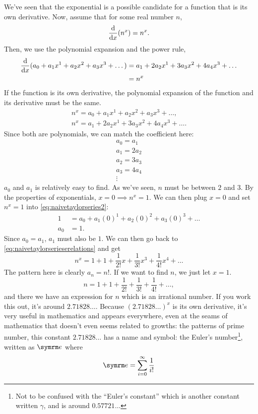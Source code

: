 We've seen that the exponential is a possible candidate for a function that is its own derivative. Now, assume that for some real number $n$,
\begin{equation}
    \odv*{(n^x)}{x} = n^x.
\end{equation}
Then, we use the polynomial expansion and the power rule,
\begin{align*}
    \odv*{(a_0 + a_1x^1 + a_2x^2 + a_3x^3 + \dots)}{x} &= a_1 + 2a_2x^1 + 3a_3x^2 + 4a_4x^3 + \dots \\
    &= n^x
\end{align*}
If the function is its own derivative, the polynomial expansion of the function and its derivative must be the same.
\begin{gather}
    n^x = a_0 + a_1x^1 + a_2x^2 + a_3x^3 + \dots, \label{eq:naivetaylorseries1}\\
    n^x = a_1 + 2a_2x^1 + 3a_3x^2 + 4a_4x^3 + \dots. \label{eq:naivetaylorseries2}
\end{gather}
Since both are polynomials, we can match the coefficient here:
\begin{equation}
    \begin{array}{c}
    a_0 = a_1 \\ a_1 = 2a_2 \\ a_2 = 3a_3 \\ a_3 = 4a_4 \\ \vdots
    \end{array}\label{eq:naivetaylorserieserelations}
\end{equation}
$a_0$ and $a_1$ is relatively easy to find. As we've seen, $n$ must be between $2$ and $3$. By the properties of exponentials, $x = 0 \implies n^x = 1$. We can then plug $x = 0$ and set $n^x = 1$ into \cref{eq:naivetaylorseries2}:
\begin{align*}
    1 &= a_0 + a_1(0)^1 + a_2(0)^2 + a_3(0)^3 + \dots \\
    a_0 &= 1.
\end{align*}
Since $a_0 = a_1$, $a_1$ must also be $1$. We can then go back to \cref{eq:naivetaylorserieserelations} and get
\begin{equation*}
    n^x = 1 + 1 + \frac{1}{2!}x + \frac{1}{3!}x^3 + \frac{1}{4!}x^4 + \dots
\end{equation*}
The pattern here is clearly $a_n = n!$. If we want to find $n$, we just let $x = 1$.
\begin{equation*}
    n = 1 + 1 + \frac{1}{2!} + \frac{1}{3!} + \frac{1}{4!} + \dots,
\end{equation*}
and there we have an expression for $n$ which is an irrational number. If you work this out, it's around $2.71828\dots$. Because $(2.71828\dots)^x$ is its own derivative, it's very useful in mathematics and appears everywhere, even at the seams of mathematics that doesn't even seems related to growths: the patterns of prime number, this constant $2.71828\dotso$ has a name and symbol: the Euler's number\footnote{Not to be confused with the ``Euler's constant'' which is another constant written $\gamma$, and is around $0.57721\dots$}, written as $\e$ where
\begin{equation}
    \e = \sum_{i = 0}^{\infty}\frac{1}{i!}
\end{equation}

